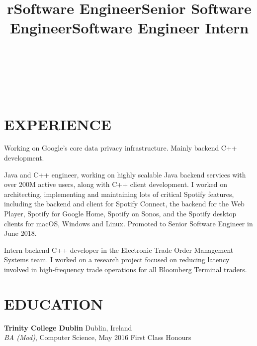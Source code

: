 \documentclass[overlapped,12pt]{res}
\begin{document}
\begin{resume}

\begin{format}
\title{r}\\
\\
\body\\
\end{format}

\section{EXPERIENCE}
\title{Software Engineer}
\begin{position}
Working on Google's core data privacy infrastructure. Mainly backend C++ development.
\end{position}

\title{Senior Software Engineer}
\begin{position}
Java and C++ engineer, working on highly scalable Java backend services with
over 200M active users, along with C++ client development. I worked on
architecting, implementing and maintaining lots of critical Spotify features,
including the backend and client for Spotify Connect, the backend for the Web
Player, Spotify for Google Home, Spotify on Sonos, and the Spotify desktop
clients for macOS, Windows and Linux.
\tinylinebreak
Promoted to Senior Software Engineer in June 2018.
\end{position}

\title{Software Engineer Intern}
\begin{position}
Intern backend C++ developer in the Electronic Trade Order Management Systems
team. I worked on a research project focused on reducing latency involved in
high-frequency trade operations for all Bloomberg Terminal traders.
\end{position}

\section{EDUCATION}
\textbf{Trinity College Dublin}\hfill
Dublin, Ireland\\
{\sl BA (Mod)}, Computer Science, May 2016\hfill 
First Class Honours


\end{resume}
\end{document}
